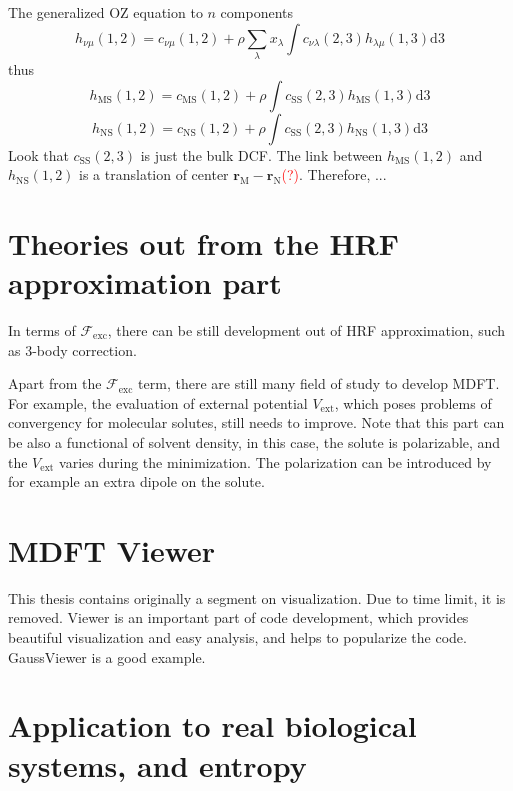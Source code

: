 The generalized \acs{OZ} equation to $n$ components
\begin{equation}
h_{\nu\mu}(1,2)=c_{\nu\mu}(1,2)+\rho\sum_{\lambda}x_{\lambda}\int c_{\nu\lambda}(2,3)h_{\lambda\mu}(1,3)\mathrm{d}3
\end{equation}
thus
\begin{equation}
h_{\text{MS}}(1,2)=c_{\text{MS}}(1,2)+\rho\int c_{\text{SS}}(2,3)h_{\text{MS}}(1,3)\mathrm{d}3
\end{equation}
\begin{equation}
h_{\text{NS}}(1,2)=c_{\text{NS}}(1,2)+\rho\int c_{\text{SS}}(2,3)h_{\text{NS}}(1,3)\mathrm{d}3
\end{equation}
Look that $c_{\text{SS}}(2,3)$ is just the bulk \acs{DCF}. The link
between $h_{\text{MS}}(1,2)$ and $h_{\text{NS}}(1,2)$ is a translation
of center $\mathbf{r}_{\text{M}}-\mathbf{r}_{\text{N}}$\textcolor{red}{(?)}.
Therefore, ...

\section{Theories out from the HRF approximation part}

In terms of $\mathcal{F}_{\mathrm{exc}}$, there can be still development
out of HRF approximation, such as 3-body correction.

Apart from the $\mathcal{F}_{\mathrm{exc}}$ term, there are still
many field of study to develop \acs{MDFT}. For example, the evaluation
of external potential $V_{\mathrm{ext}}$, which poses problems of
convergency for molecular solutes, still needs to improve. Note that
this part can be also a functional of solvent density, in this case,
the solute is polarizable, and the $V_{\mathrm{ext}}$ varies during
the minimization. The polarization can be introduced by for example
an extra dipole on the solute.

\section{MDFT Viewer}

This thesis contains originally a segment on visualization. Due to
time limit, it is removed. Viewer is an important part of code development,
which provides beautiful visualization and easy analysis, and helps
to popularize the code. GaussViewer is a good example.

\section{Application to real biological systems, and entropy}

